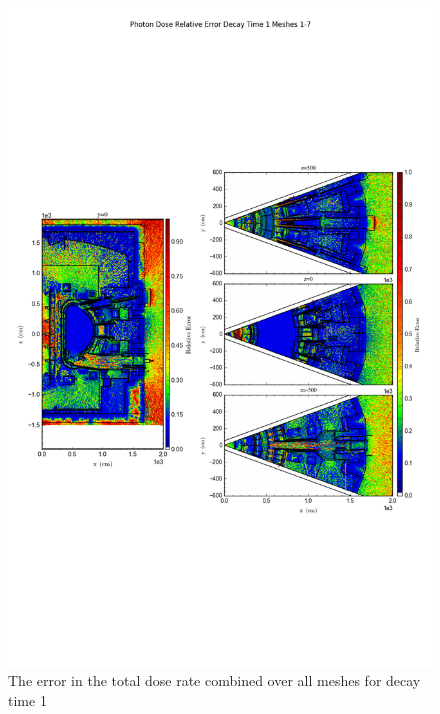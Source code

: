 \documentclass[12pt]{article}
\begin{document}
\begin{figure}[ht!]
\centering
\includegraphics[trim={0cm 9cm 0cm 10cm},clip,scale=0.75]{../plots/final_model_with_b4c/Photon_Dose_Relative_Error_Decay_Time_1_Meshes_1-7.png}
\caption{The error in the total dose rate combined over all meshes for decay time 1}
\label{fig:photons_dc1_b4c_total_error}
\end{figure}
\end{document}
